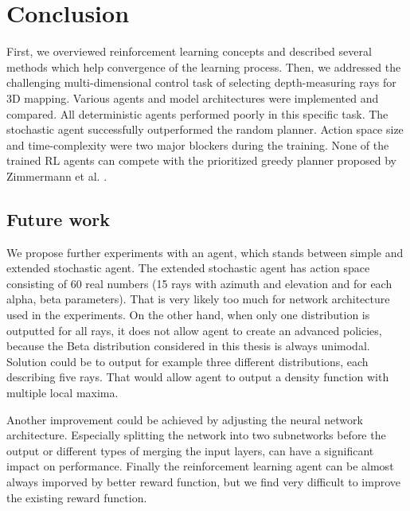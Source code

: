 \section{Conclusion}
First, we overviewed reinforcement learning concepts and described several methods which help convergence of the learning process. Then, we addressed the challenging multi-dimensional control task of selecting depth-measuring rays for 3D mapping. Various agents and model architectures were implemented and compared. All deterministic agents performed poorly in this specific task. The stochastic agent successfully outperformed the random planner. Action space size and time-complexity were two major blockers during the training. None of the trained RL agents can compete with the prioritized greedy planner proposed by Zimmermann et al. \cite{zimmermann2017}.


\subsection{Future work}
We propose further experiments with an agent, which stands between simple and extended stochastic agent. The extended stochastic agent has action space consisting of 60 real numbers (15 rays with azimuth and elevation and for each alpha, beta parameters). That is very likely too much for network architecture used in the experiments. On the other hand, when only one distribution is outputted for all rays, it does not allow agent to create an advanced policies, because the Beta distribution considered in this thesis is always unimodal. Solution could be to output for example three different distributions, each describing five rays. That would allow agent to output a density function with multiple local maxima. \par Another improvement could be achieved by adjusting the neural network architecture. Especially splitting the network into two subnetworks before the output or different types of merging the input layers, can have a significant impact on performance. Finally the reinforcement learning agent can be almost always imporved by better reward function, but we find very difficult to improve the existing reward function.
